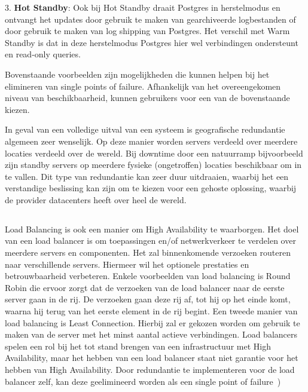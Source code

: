 3. \textbf{Hot Standby}: Ook bij Hot Standby draait Postgres in herstelmodus en ontvangt het updates door gebruik te maken van gearchiveerde logbestanden of door gebruik te maken van log shipping van Postgres. Het verschil met Warm Standby is dat in deze herstelmodus Postgres hier wel verbindingen ondersteunt en read-only queries.

Bovenstaande voorbeelden zijn mogelijkheden die kunnen helpen bij het elimineren van single points of failure. Afhankelijk van het overeengekomen niveau van beschikbaarheid, kunnen gebruikers voor een van de bovenstaande kiezen.

In geval van een volledige uitval van een systeem is geografische redundantie algemeen zeer wenselijk. Op deze manier worden servers verdeeld over meerdere locaties verdeeld over de wereld. Bij downtime door een natuurramp bijvoorbeeld zijn standby servers op meerdere fysieke (ongetroffen) locaties beschikbaar om in te vallen. Dit type van redundantie kan zeer duur uitdraaien, waarbij het een verstandige beslissing kan zijn om te kiezen voor een gehoste oplossing, waarbij de provider datacenters heeft over heel de wereld.

\subsection{}
\label{subsec:Load Balancing}

Load Balancing is ook een manier om High Availability te waarborgen. Het doel van een load balancer is om toepassingen en/of netwerkverkeer te verdelen over meerdere servers en componenten. Het zal binnenkomende verzoeken routeren naar verschillende servers. Hiermeer wil het optionele prestaties en betrouwbaarheid verbeteren. Enkele voorbeelden van load balancing is Round Robin die ervoor zorgt dat de verzoeken van de load balancer naar de eerste server gaan in de rij. De verzoeken gaan deze rij af, tot hij op het einde komt, waarna hij terug van het eerste element in de rij begint. Een tweede manier van load balancing is Least Connection. Hierbij zal er gekozen worden om gebruik te maken van de server met het minst aantal actieve verbindingen. Load balancers spelen een rol bij het tot stand brengen van een infrastructuur met High Availability, maar het hebben van een load balancer staat niet garantie voor het hebben van High Availability. Door redundantie te implementeren voor de load balancer zelf, kan deze geelimineerd worden als een single point of failure~\autocite{Jevtic2018})

